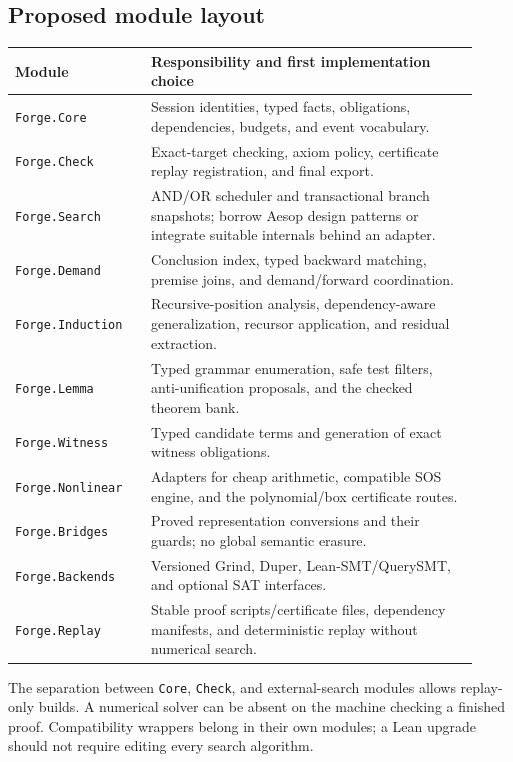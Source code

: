 \documentclass[11pt,a4paper]{article}
\newcommand{\code}[1]{\texttt{#1}}
\begin{document}
\subsection{Proposed module layout}
\begin{longtable}{p{0.27\linewidth}p{0.65\linewidth}}
\toprule
Module & Responsibility and first implementation choice \\
\midrule
\endhead
\code{Forge.Core} & Session identities, typed facts, obligations, dependencies, budgets, and event vocabulary. \\
\code{Forge.Check} & Exact-target checking, axiom policy, certificate replay registration, and final export. \\
\code{Forge.Search} & AND/OR scheduler and transactional branch snapshots; borrow Aesop design patterns or integrate suitable internals behind an adapter. \\
\code{Forge.Demand} & Conclusion index, typed backward matching, premise joins, and demand/forward coordination. \\
\code{Forge.Induction} & Recursive-position analysis, dependency-aware generalization, recursor application, and residual extraction. \\
\code{Forge.Lemma} & Typed grammar enumeration, safe test filters, anti-unification proposals, and the checked theorem bank. \\
\code{Forge.Witness} & Typed candidate terms and generation of exact witness obligations. \\
\code{Forge.Nonlinear} & Adapters for cheap arithmetic, compatible SOS engine, and the polynomial/box certificate routes. \\
\code{Forge.Bridges} & Proved representation conversions and their guards; no global semantic erasure. \\
\code{Forge.Backends} & Versioned Grind, Duper, Lean-SMT/QuerySMT, and optional SAT interfaces. \\
\code{Forge.Replay} & Stable proof scripts/certificate files, dependency manifests, and deterministic replay without numerical search. \\
\bottomrule
\end{longtable}

The separation between \code{Core}, \code{Check}, and external-search modules
allows replay-only builds. A numerical solver can be absent on the machine
checking a finished proof. Compatibility wrappers belong in their own modules;
a Lean upgrade should not require editing every search algorithm.
\end{document}
